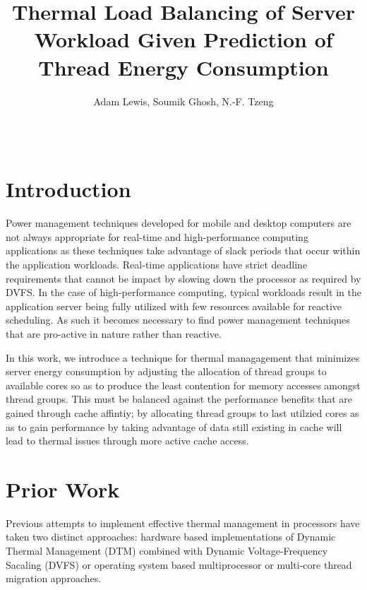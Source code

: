 \documentclass[]{sig-alternate-hotpower09}
\begin{document}
\title{Thermal Load Balancing of Server Workload Given Prediction of
  Thread Energy Consumption}
\author{
\alignauthor Adam Lewis, Soumik Ghosh, N.-F. Tzeng \\
\\
\\
}
\maketitle
\newtheorem{defn}{Definition}
\newtheorem{thm}{Theorem}
\thispagestyle{empty}
\begin{abstract}

\end{abstract}

\section{Introduction}
\label{sec:Introduction}
Power management techniques developed for mobile and desktop computers
are not always appropriate for real-time and high-performance computing
applications as these techniques take advantage of slack periods that
occur within the application workloads. Real-time applications have
strict deadline requirements that cannot be impact by slowing down the
processor as required by DVFS. In the case of high-performance
computing, typical workloads result in the application server being
fully utilized with few resources available for reactive scheduling. As
such it becomes necessary to find power management techniques that are
pro-active in nature rather than reactive.

In this work, we introduce a technique for thermal
managagement that minimizes server energy consumption by adjusting the
allocation of thread groups to available cores so as to produce the
least contention for memory accesses amongst thread groups.   This must
be balanced against the performance benefits that are gained through
cache affintiy; by allocating thread groups to last utilzied cores as as
to gain performance by taking advantage of data still existing in cache
will lead to thermal issues through more active cache access.

\section{Prior Work}
\label{sec:prior}
Previous attempts to implement effective thermal management in
processors have taken two distinct approaches: hardware based
implementations of Dynamic Thermal Management (DTM) combined with Dynamic
Voltage-Frequency Sacaling (DVFS) or operating system based
multiprocessor or multi-core thread migration approaches.
\end{document}
